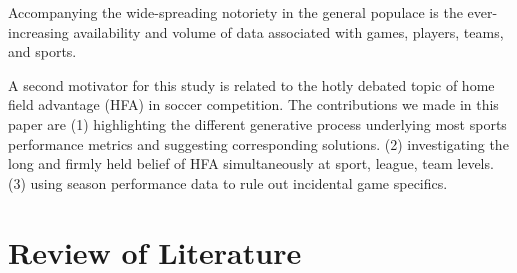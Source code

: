 \documentclass[USenglish]{article}
\begin{document}
Accompanying the wide-spreading notoriety in the general populace is the ever-increasing availability and volume of data associated with games, players, teams, and sports.   









\citep{Gajewski2006}

 


A second motivator for this study is related to the hotly debated topic of home field advantage (HFA) in soccer competition. The contributions we made in this paper are (1) highlighting the different generative process underlying most sports performance metrics and suggesting corresponding solutions.  (2) investigating the long and firmly held belief of HFA simultaneously at sport, league, team levels. (3) using season performance data to rule out incidental game specifics.
 
\section{Review of Literature} 
\end{document}
